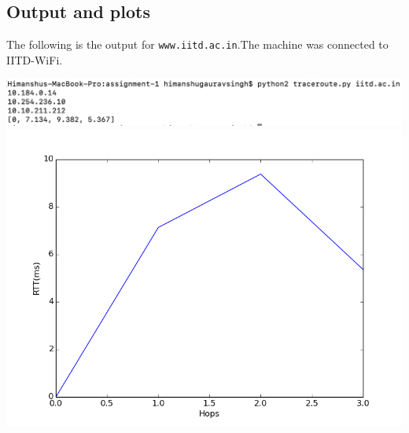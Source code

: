 \documentclass[a4paper]{article}
\begin{document}
\subsection{Output and plots}
The following is the output for \texttt{www.iitd.ac.in}.The machine was connected to IITD-WiFi.
\begin{center}
\includegraphics[width=\textwidth,height=\textheight,keepaspectratio]{iitd.ac.in.png}
\\
  \includegraphics[width=\textwidth/2,height=\textheight/2,keepaspectratio]{traceroute_iitd.ac.in.png}
\\
\end{center}
\end{document}
